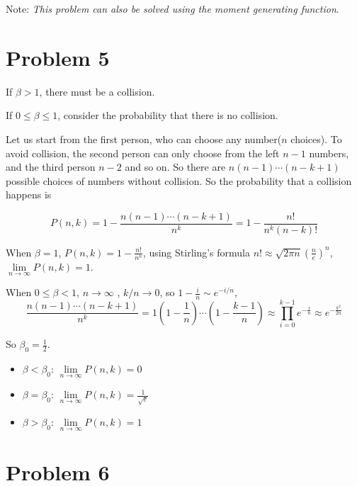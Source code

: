 \documentclass{article}
\begin{document}
Note: \textit{This problem can also be solved using the moment generating function}.

\section{Problem 5}

If $\beta>1$, there must be a collision.

If $0\leqslant \beta \leqslant 1$, consider the probability that there is no collision. 

Let us start from the first person, who can choose any number($n$ choices). To avoid collision, the second person can only choose from the left $n-1$ numbers, and the third person $n-2$ and so on. So there are $n(n-1)\cdots(n-k+1)$ possible choices of numbers without collision. So the probability that a collision happens is

\begin{equation}
    P(n,k) = 1- \frac{n(n-1)\cdots(n-k+1)}{ n^k} = 1- \frac {n!}{n^k (n-k)!} 
\end{equation}

When $\beta = 1$, $P(n,k) = 1- \frac{n!}{n^n}$, using Stirling's formula $n ! \approx \sqrt{2 \pi n}\left(\frac{n}{e}\right)^{n}$, $\lim\limits_{n\to\infty}P(n,k) = 1$.



When $0 \leqslant \beta<1$, $n\to\infty$ , $k/n \to 0$, so $1-\frac i n \sim e^{-i/n}$,
\begin{equation}
    \frac{n(n-1)\cdots(n-k+1)}{ n^k} = 1(1-\frac {1}{n})\cdots(1-\frac {k-1}{n}) \approx \prod_{i=0}^{k-1} e^{-\frac i n} \approx e^{-\frac {k^2}{2n} }
\end{equation}



So $\beta_0 = \frac 1 2$.  

\begin{itemize}
    \item $\beta<\beta_0$: $\lim\limits_{n\to \infty} P(n,k) = 0$
    \item $\beta=\beta_0$: $\lim\limits_{n\to \infty} P(n,k) = \frac 1 {\sqrt{e}}$
    \item $\beta>\beta_0$: $\lim\limits_{n\to \infty} P(n,k) = 1$
\end{itemize}

\section{Problem 6}
\end{document}

